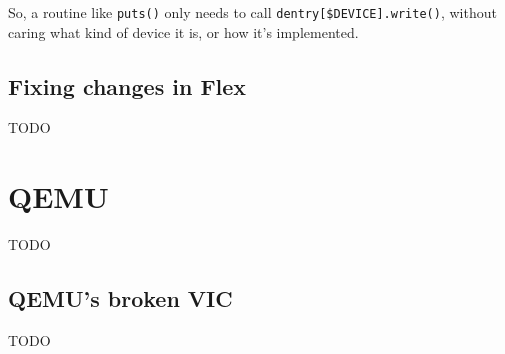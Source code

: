 \documentclass[12pt]{article}
\newcommand{\TODO}[1]{{\huge\color{red}TODO \Large #1}}
\newcommand{\code}[1]{{\tt #1}}
\begin{document}
So, a routine like \code{puts()} only needs to call
\code{dentry[\$DEVICE].write()}, without caring what kind of device it is, or
how it's implemented.

\subsection{Fixing changes in Flex}

\TODO{}

\section{QEMU}

\TODO{}

\subsection{QEMU's broken VIC}

\TODO{}
\end{document}
